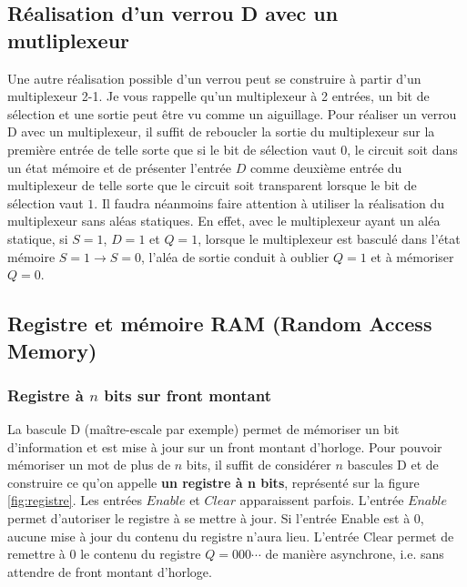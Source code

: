 \subsection{Réalisation d'un verrou D avec un mutliplexeur}
\label{subsec:verrouD_multiplexeur}

Une autre réalisation possible d'un verrou peut se construire à partir d'un multiplexeur 2-1. Je vous rappelle qu'un multiplexeur à 2 entrées, un bit de sélection et une sortie peut être vu comme un aiguillage. Pour réaliser un verrou D avec un multiplexeur, il suffit de reboucler la sortie du multiplexeur sur la première entrée de telle sorte que si le bit de sélection vaut $0$, le circuit soit dans un état mémoire et de présenter l'entrée $D$ comme deuxième entrée du multiplexeur de telle sorte que le circuit soit transparent lorsque le bit de sélection vaut $1$. Il faudra néanmoins faire attention à utiliser la réalisation du multiplexeur sans aléas statiques. En effet, avec le multiplexeur ayant un aléa statique, si $S=1$, $D=1$ et $Q=1$, lorsque le multiplexeur est basculé dans l'état mémoire $S=1 \rightarrow S=0$, l'aléa de sortie conduit à oublier $Q=1$ et à mémoriser $Q=0$.

\subsection{Registre et mémoire RAM (Random Access Memory)}

\subsubsection{Registre à $n$ bits sur front montant}

La bascule D (maître-escale par exemple) permet de mémoriser un bit d'information et est mise à jour sur un front montant d'horloge. Pour pouvoir mémoriser un mot de plus de $n$ bits, il suffit de considérer $n$ bascules D et de construire ce qu'on appelle \textbf{un registre à n bits}, représenté sur la figure \ref{fig:registre}. Les entrées $Enable$ et $Clear$ apparaissent parfois. L'entrée $Enable$ permet d'autoriser le registre à se mettre à jour. Si l'entrée Enable est à $0$, aucune mise à jour du contenu du registre n'aura lieu. L'entrée Clear permet de remettre à $0$ le contenu du registre $Q=000\cdots$ de manière asynchrone, i.e. sans attendre de front montant d'horloge.

